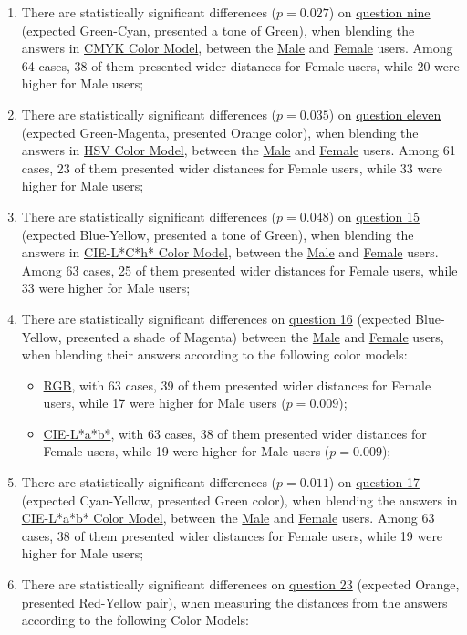 \begin{enumerate}
  \item There are statistically significant differences ($p = 0.027$) on \ul{question nine} (expected Green-Cyan, presented a tone of Green), when blending the answers in \ul{CMYK Color Model}, between the \ul{Male} and \ul{Female} users. Among 64 cases, 38 of them presented wider distances for
  Female users, while 20 were higher for Male users;
  \item There are statistically significant differences ($p = 0.035$) on \ul{question eleven} (expected Green-Magenta, presented Orange color), when blending the answers in \ul{HSV Color Model}, between the \ul{Male} and \ul{Female} users. Among 61 cases, 23 of them presented wider distances for
  Female users, while 33 were higher for Male users;
  \item There are statistically significant differences ($p = 0.048$) on \ul{question 15} (expected Blue-Yellow, presented a tone of Green), when blending the answers in \ul{CIE-L*C*h* Color Model}, between the \ul{Male} and \ul{Female} users. Among 63 cases, 25 of them presented wider distances for
  Female users, while 33 were higher for Male users;
  \item There are statistically significant differences on \ul{question 16} (expected Blue-Yellow, presented a shade of Magenta) between the \ul{Male} and \ul{Female} users, when blending their answers according to the following color models:
    \begin{itemize}
      \item \ul{RGB}, with 63 cases, 39 of them presented wider distances for Female users, while 17 were higher for Male users ($p = 0.009$);
      \item \ul{CIE-L*a*b*}, with 63 cases, 38 of them presented wider distances for Female users, while 19 were higher for Male users ($p = 0.009$);
    \end{itemize}
  \item There are statistically significant differences ($p = 0.011$) on \ul{question 17} (expected Cyan-Yellow, presented Green color), when blending the answers in \ul{CIE-L*a*b* Color Model}, between the \ul{Male} and \ul{Female} users. Among 63 cases, 38 of them presented wider distances for
  Female users, while 19 were higher for Male users;
  \item There are statistically significant differences on \ul{question 23} (expected Orange, presented Red-Yellow pair), when measuring the distances from the answers according to the following Color Models:

\end{enumerate}
